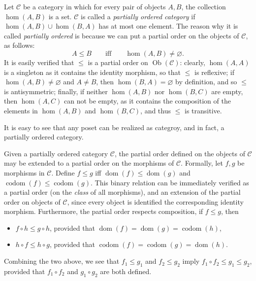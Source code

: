 \documentclass[12pt]{article}
\begin{document}
Let $\mathcal{C}$ be a category in which for every pair of objects $A,B$, the collection $\hom(A,B)$ is a set.  $\mathcal{C}$ is called a \emph{partially ordered category} if $\hom(A,B)\cup \hom(B,A)$ has at most one element.  The reason why it is called \emph{partially ordered} is because we can put a partial order on the objects of $\mathcal{C}$, as follows: $$A\le B \qquad \mbox{iff} \qquad \hom(A,B)\ne \varnothing.$$
It is easily verified that $\le$ is a partial order on $\operatorname{Ob}(\mathcal{C})$: clearly, $\hom(A,A)$ is a singleton as it contains the identity morphism, so that $\le$ is reflexive; if $\hom(A,B)\ne \varnothing$ and $A\ne B$, then $\hom(B,A)=\varnothing$ by definition, and so $\le$ is antisymmetric; finally, if neither $\hom(A,B)$ nor $\hom(B,C)$ are empty, then $\hom(A,C)$ can not be empty, as it contains the composition of the elements in $\hom(A,B)$ and $\hom(B,C)$, and thus $\le$ is transitive.

It is easy to see that any poset can be realized as categroy, and in fact, a partially ordered category.

Given a partially ordered category $\mathcal{C}$, the partial order defined on the objects of $\mathcal{C}$ may be extended to a partial order on the morphisms of $\mathcal{C}$.  Formally, let $f,g$ be morphisms in $\mathcal{C}$.  Define $f\le g$ iff $\operatorname{dom}(f)\le \operatorname{dom}(g)$ and $\operatorname{codom}(f)\le \operatorname{codom}(g)$.  This binary relation can be immediately verified as a partial order (on the \emph{class} of all morphisms), and an extension of the partial order on objects of $\mathcal{C}$, since every object is identified the corresponding identity morphism.  Furthermore, the partial order respects composition, if $f\le g$, then 
\begin{itemize}
\item $f\circ h \le g\circ h$, provided that $\operatorname{dom}(f)=\operatorname{dom}(g)=\operatorname{codom}(h)$,
\item $h\circ f \le h\circ g$, provided that $\operatorname{codom}(f)=\operatorname{codom}(g)=\operatorname{dom}(h)$.
\end{itemize}
Combining the two above, we see that $f_1\le g_1$ and $f_2\le g_2$ imply $f_1\circ f_2 \le g_1\le g_2$, provided that $f_1\circ f_2$ and $g_1\circ g_2$ are both defined.
\end{document}
